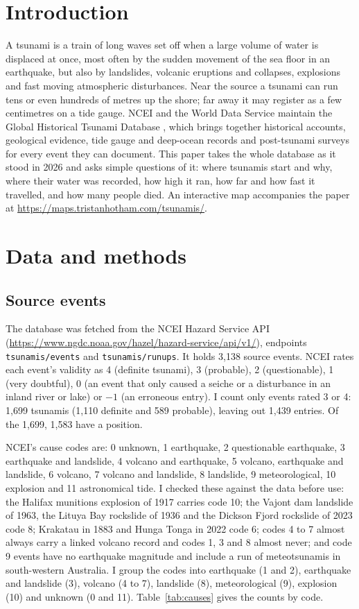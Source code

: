 \documentclass[11pt,a4paper]{article}
\begin{document}
\section{Introduction}
A tsunami is a train of long waves set off when a large volume of water is displaced at once, most often by the sudden movement of the sea floor in an earthquake, but also by landslides, volcanic eruptions and collapses, explosions and fast moving atmospheric disturbances. Near the source a tsunami can run tens or even hundreds of metres up the shore; far away it may register as a few centimetres on a tide gauge. NCEI and the World Data Service maintain the Global Historical Tsunami Database \citep{ncei}, which brings together historical accounts, geological evidence, tide gauge and deep-ocean records and post-tsunami surveys for every event they can document. This paper takes the whole database as it stood in 2026 and asks simple questions of it: where tsunamis start and why, where their water was recorded, how high it ran, how far and how fast it travelled, and how many people died. An interactive map accompanies the paper at \url{https://maps.tristanhotham.com/tsunamis/}.

\section{Data and methods}
\subsection{Source events}
The database was fetched from the NCEI Hazard Service API (\url{https://www.ngdc.noaa.gov/hazel/hazard-service/api/v1/}), endpoints \texttt{tsunamis/events} and \texttt{tsunamis/runups}. It holds 3,138 source events. NCEI rates each event's validity as 4 (definite tsunami), 3 (probable), 2 (questionable), 1 (very doubtful), 0 (an event that only caused a seiche or a disturbance in an inland river or lake) or $-1$ (an erroneous entry). I count only events rated 3 or 4: 1,699 tsunamis (1,110 definite and 589 probable), leaving out 1,439 entries. Of the 1,699, 1,583 have a position.

NCEI's cause codes are: 0 unknown, 1 earthquake, 2 questionable earthquake, 3 earthquake and landslide, 4 volcano and earthquake, 5 volcano, earthquake and landslide, 6 volcano, 7 volcano and landslide, 8 landslide, 9 meteorological, 10 explosion and 11 astronomical tide. I checked these against the data before use: the Halifax munitions explosion of 1917 carries code 10; the Vajont dam landslide of 1963, the Lituya Bay rockslide of 1936 and the Dickson Fjord rockslide of 2023 code 8; Krakatau in 1883 and Hunga Tonga in 2022 code 6; codes 4 to 7 almost always carry a linked volcano record and codes 1, 3 and 8 almost never; and code 9 events have no earthquake magnitude and include a run of meteotsunamis in south-western Australia. I group the codes into earthquake (1 and 2), earthquake and landslide (3), volcano (4 to 7), landslide (8), meteorological (9), explosion (10) and unknown (0 and 11). Table~\ref{tab:causes} gives the counts by code.
\end{document}
